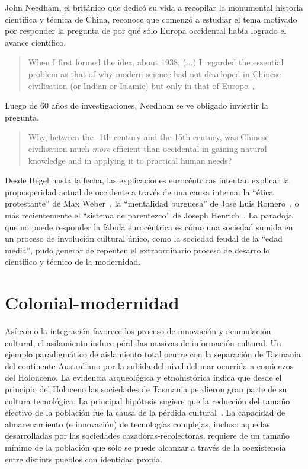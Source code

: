 \documentclass[a4paper,10pt]{book}
\theoremstyle{definition}1
\begin{document}

John Needham, el británico que dedicó su vida a recopilar la monumental historia científica y técnica de China, reconoce que comenzó a estudiar el tema motivado por responder la pregunta de por qué sólo Europa occidental había logrado el avance científico.
\begin{quotation}
When I first formed the idea, about 1938, (...) I regarded the essential problem as that of why modern science had not developed in Chinese civilisation (or Indian or Islamic) but only in that of Europe~\cite{needham2004-generalConclusionsAndReflections}.%
\end{quotation}
Luego de 60 años de investigaciones, Needham se ve obligado inviertir la pregunta.
\begin{quotation}
Why, between the -1th century and the 15th century, was Chinese civilisation much \emph{more} efficient than occidental in gaining natural knowledge and in applying it to practical human needs?~\cite{needham2004-generalConclusionsAndReflections}
\end{quotation}


Desde Hegel hasta la fecha, las explicaciones eurocéntricas intentan explicar la proposperidad actual de occidente a través de una causa interna: la ``ética protestante'' de Max Weber~\cite{weber1905-eticaProtestante}, la ``mentalidad burguesa'' de José Luis Romero~\cite{romero1967-revolucionBurguesa}, o más recientemente el ``sistema de parentezco'' de Joseph Henrich~\cite{henrich2020-weirdest}.
La paradoja que no puede responder la fábula eurocéntrica es cómo una sociedad sumida en un proceso de involución cultural único, como la sociedad feudal de la ``edad media'', pudo generar de repenten el extraordinario proceso de desarrollo científico y técnico de la modernidad.

\section{Colonial-modernidad}

Así como la integración favorece los proceso de innovación y acumulación cultural, el asilamiento induce pérdidas masivas de información cultural.
%
Un ejemplo paradigmático de aislamiento total ocurre con la separación de Tasmania del continente Australiano por la subida del nivel del mar ocurrida a comienzos del Holonceno.
%
La evidencia arqueológica y etnohistórica indica que desde el principio del Holoceno las sociedades de Tasmania perdieron gran parte de su cultura tecnológica.
La principal hipótesis sugiere que la reducción del tamaño efectivo de la población fue la causa de la pérdida cultural~\cite{Henrich2004}.
%
La capacidad de almacenamiento (e innovación) de tecnologías complejas, incluso aquellas desarrolladas por las sociedades cazadoras-recolectoras, requiere de un tamaño mínimo de la población que sólo se puede alcanzar a través de la coexistencia entre distints pueblos con identidad propia.
\end{document}
